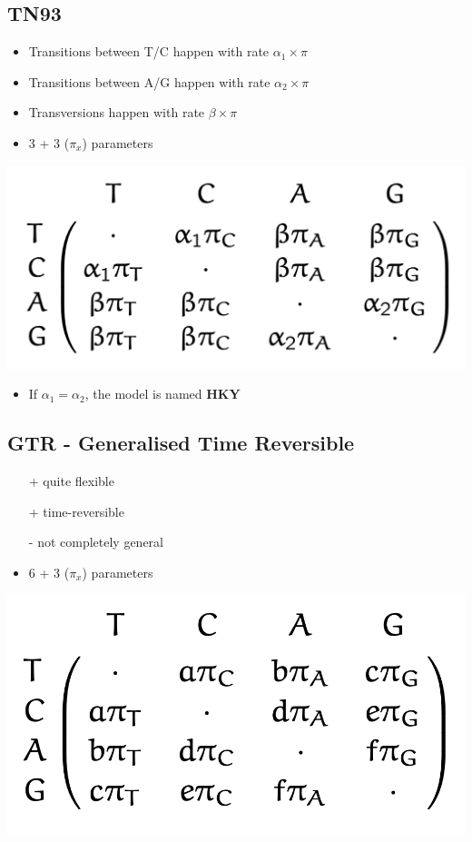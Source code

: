 \documentclass{article}
\begin{document}
\begin{multicols*}{3}
\subsection{TN93}
\begin{itemize}
    \item Transitions between T/C happen with rate $\alpha_1 \times \pi$
    \item Transitions between A/G happen with rate $\alpha_2 \times \pi$
    \item Transversions happen with rate $\beta\times \pi$
    \item 3 + 3 ($\pi_x$) parameters 
\end{itemize}

\begin{center}
    \includegraphics[width=0.7\linewidth]{tn93.png}
\end{center}

\begin{itemize}
    \item If $\alpha_1 = \alpha_2$, the model is named \textbf{HKY}
\end{itemize}

\subsection{GTR - Generalised Time Reversible}

\begin{itemize}
    \item[+] quite flexible
    \item[+] time-reversible
    \item[-] not completely general
    \item 6 + 3 ($\pi_x$) parameters 
\end{itemize}

\begin{center}
    \includegraphics[width=0.7\linewidth]{GTR.png}
\end{center}

\end{multicols*}
\end{document}
